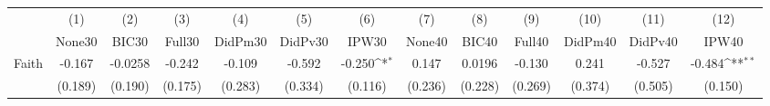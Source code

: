 {
\def\sym#1{\ifmmode^{#1}\else\(^{#1}\)\fi}
\begin{tabular}{l*{12}{c}}
\toprule
            &\multicolumn{1}{c}{(1)}&\multicolumn{1}{c}{(2)}&\multicolumn{1}{c}{(3)}&\multicolumn{1}{c}{(4)}&\multicolumn{1}{c}{(5)}&\multicolumn{1}{c}{(6)}&\multicolumn{1}{c}{(7)}&\multicolumn{1}{c}{(8)}&\multicolumn{1}{c}{(9)}&\multicolumn{1}{c}{(10)}&\multicolumn{1}{c}{(11)}&\multicolumn{1}{c}{(12)}\\
            &\multicolumn{1}{c}{None30}&\multicolumn{1}{c}{BIC30}&\multicolumn{1}{c}{Full30}&\multicolumn{1}{c}{DidPm30}&\multicolumn{1}{c}{DidPv30}&\multicolumn{1}{c}{IPW30}&\multicolumn{1}{c}{None40}&\multicolumn{1}{c}{BIC40}&\multicolumn{1}{c}{Full40}&\multicolumn{1}{c}{DidPm40}&\multicolumn{1}{c}{DidPv40}&\multicolumn{1}{c}{IPW40}\\
\midrule
Faith       &      -0.167         &     -0.0258         &      -0.242         &      -0.109         &      -0.592         &      -0.250\sym{*}  &       0.147         &      0.0196         &      -0.130         &       0.241         &      -0.527         &      -0.484\sym{**} \\
            &     (0.189)         &     (0.190)         &     (0.175)         &     (0.283)         &     (0.334)         &     (0.116)         &     (0.236)         &     (0.228)         &     (0.269)         &     (0.374)         &     (0.505)         &     (0.150)         \\
\bottomrule
\end{tabular}
}
